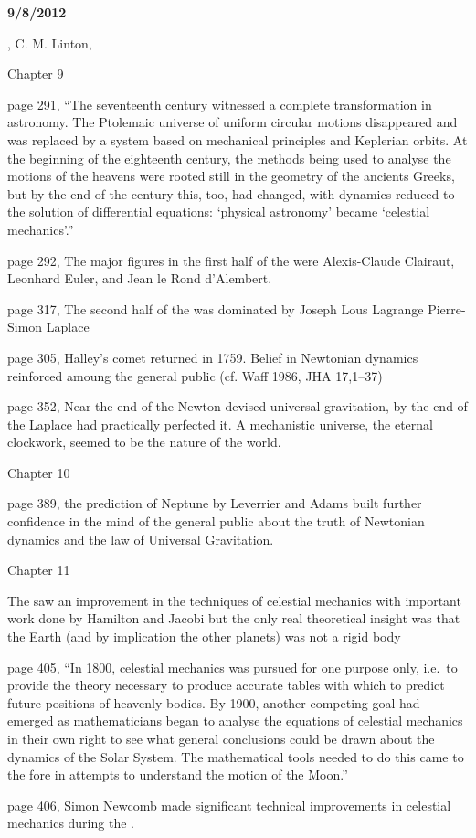 {\bf 9/8/2012}

, C. M. Linton, \cite{Linton2004}

Chapter 9

page 291, ``The seventeenth century witnessed a complete
transformation in astronomy.  The Ptolemaic universe of uniform
circular motions disappeared and was replaced by a system based on
mechanical principles and Keplerian orbits. At the beginning of the
eighteenth century, the methods being used to analyse the motions of
the heavens were rooted still in the geometry of the ancients Greeks,
but by the end of the century this, too, had changed, with dynamics
reduced to the solution of differential equations: `physical
astronomy' became `celestial mechanics'.''

page 292, The major figures in the first half of the  were
Alexis-Claude Clairaut, Leonhard Euler, and Jean le Rond d'Alembert.

page 317, The second half of the  was dominated by Joseph Lous
Lagrange Pierre-Simon Laplace

page 305, Halley's comet returned in 1759. Belief in Newtonian
dynamics reinforced amoung the general public (cf. Waff 1986, JHA
17,1--37)

page 352, Near the end of the  Newton devised universal
gravitation, by the end of the  Laplace had practically
perfected it. A mechanistic universe, the eternal clockwork, seemed to
be the nature of the world.

Chapter 10

page 389, the prediction of Neptune by Leverrier and Adams built
further confidence in the mind of the general public about the truth
of Newtonian dynamics and the law of Universal Gravitation.

Chapter 11

The  saw an improvement in the techniques of celestial
mechanics with important work done by Hamilton and Jacobi but the
only real theoretical insight was that the Earth (and by implication
the other planets) was not a rigid body

page 405, ``In 1800, celestial mechanics was pursued for one purpose
only, i.e.\ to provide the theory necessary to produce accurate tables
with which to predict future positions of heavenly bodies. By 1900,
another competing goal had emerged as mathematicians began to analyse
the equations of celestial mechanics in their own right to see what
general conclusions could be drawn about the dynamics of the Solar
System.  The mathematical tools needed to do this came to the fore in
attempts to understand the motion of the Moon.''

page 406, Simon Newcomb made significant technical improvements
in celestial mechanics during the .


